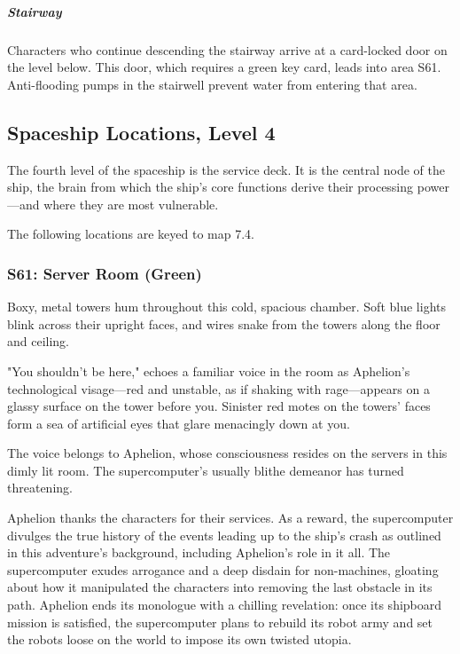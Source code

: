 \documentclass[10pt,a4paper,twoside,bg=print,twocolumn,openany,nodeprecatedcode]{dndbook}
\begin{document}
\subparagraph{Stairway}
Characters who continue descending the stairway arrive at a card-locked door on the level below. This door, which requires a green key card, leads into area S61. Anti-flooding pumps in the stairwell prevent water from entering that area.

\subsection{Spaceship Locations, Level 4}
The fourth level of the spaceship is the service deck. It is the central node of the ship, the brain from which the ship's core functions derive their processing power—and where they are most vulnerable.

The following locations are keyed to map 7.4.

\subsubsection{S61: Server Room (Green)}
\begin{DndReadAloud}{}
Boxy, metal towers hum throughout this cold, spacious chamber. Soft blue lights blink across their upright faces, and wires snake from the towers along the floor and ceiling.

"You shouldn't be here," echoes a familiar voice in the room as Aphelion's technological visage—red and unstable, as if shaking with rage—appears on a glassy surface on the tower before you. Sinister red motes on the towers' faces form a sea of artificial eyes that glare menacingly down at you.

\end{DndReadAloud}

The voice belongs to Aphelion, whose consciousness resides on the servers in this dimly lit room. The supercomputer's usually blithe demeanor has turned threatening.

Aphelion thanks the characters for their services. As a reward, the supercomputer divulges the true history of the events leading up to the ship's crash as outlined in this adventure's background, including Aphelion's role in it all. The supercomputer exudes arrogance and a deep disdain for non-machines, gloating about how it manipulated the characters into removing the last obstacle in its path. Aphelion ends its monologue with a chilling revelation: once its shipboard mission is satisfied, the supercomputer plans to rebuild its robot army and set the robots loose on the world to impose its own twisted utopia.
\end{document}
